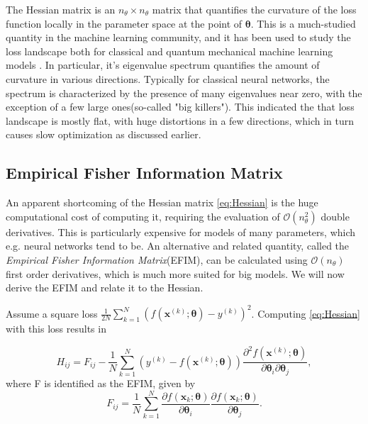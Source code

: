 The Hessian matrix is an $n_\theta \times n_\theta$ matrix that quantifies the curvature of the loss function locally in the parameter space at the point of $\boldsymbol{\theta}$. This is a much-studied quantity in the machine learning community, and it has been used to study the loss landscape both for classical and quantum mechanical machine learning models \cite{LeCun2012} \cite{Huembeli_2021}. In particular, it's eigenvalue spectrum quantifies the amount of curvature in various directions. Typically for classical neural networks, the spectrum is characterized by the presence of many eigenvalues near zero, with the exception of a few large ones(so-called "big killers")\cite{LeCun2012}. This indicated the that loss landscape is mostly flat, with huge distortions in a few directions, which in turn causes slow optimization as discussed earlier. 

\subsection{Empirical Fisher Information Matrix}\label{sec:EFIM}
An apparent shortcoming of the Hessian matrix \autoref{eq:Hessian} is the huge computational cost of computing it, requiring the evaluation of  $\mathcal{O}(n_\theta^2)$ double derivatives. This is particularly expensive for models of many parameters, which e.g. neural networks tend to be. An alternative and related quantity, called the \emph{Empirical Fisher Information Matrix}(EFIM)\cite{karakida2019universal}, can be calculated using $\mathcal{O}(n_\theta)$ first order derivatives, which is much more suited for big models. We will now derive the EFIM and relate it to the Hessian.

Assume a square loss $\frac{1}{2N}\sum_{k=1}^{N} (f(\boldsymbol{x}^{(k)}; \boldsymbol{\theta}) - y^{(k)})^2$. Computing \autoref{eq:Hessian} with this loss results in 
    
\begin{equation}\label{eq:HessianSquareLoss}
    H_{ij} = F_{ij} -
    \frac{1}{N}\sum_{k=1}^{N} (y^{(k)} - f(\boldsymbol{x}^{(k)};\boldsymbol{\theta}))\frac{\partial^2 f(\boldsymbol{x}^{(k)};\boldsymbol{\theta})}{\partial \boldsymbol{\theta}_i\partial \boldsymbol{\theta}_j}, 
\end{equation}
where F is identified as the EFIM, given by
\begin{equation}
\label{eq:EmpiricalFisher}
    F_{ij} =  \frac{1}{N}\sum_{k=1}^{N}
    \frac{\partial f(\boldsymbol{x}_k;\boldsymbol{\theta})}{\partial \boldsymbol{\theta}_i}
    \frac{\partial f(\boldsymbol{x}_k;\boldsymbol{\theta})}{\partial \boldsymbol{\theta}_j}.
\end{equation}

